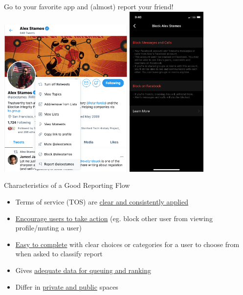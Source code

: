 \documentclass[nobackground,dvipsnames,table]{beamer}
\begin{document}
\begin{frame}{Go to your favorite app and (almost) report your friend!}
    \includegraphics[width=0.5\textwidth]{block-alex-stamos-1}
    \includegraphics[width=0.3\textwidth]{block-alex-stamos-2}
\end{frame}

\begin{frame}{Characteristics of a Good Reporting Flow}
    \begin{itemize}
        \item Terms of service (TOS) are \underline{clear and consistently applied}
        \item \underline{Encourage users to take action} (eg. block other user from viewing profile/muting a user)
        \item \underline{Easy to complete} with clear choices or categories for a user to choose from when asked to classify report
        \item Gives \underline{adequate data for queuing and ranking}
        \item Differ in \underline{private and public} spaces
    \end{itemize}
\end{frame}
\end{document}
